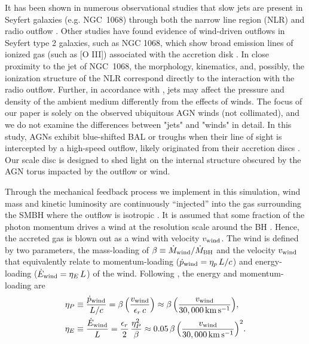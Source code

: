 \documentclass[fleqn,usenatbib]{mnras}
\begin{document}
It has been shown in numerous observational studies that slow jets are present in Seyfert galaxies (e.g. NGC~1068) through both the narrow line region (NLR) and radio outflow \citep[see][]{Axon1998, Roy2000, Gallimore1996a}. Other studies have found evidence of wind-driven outflows in Seyfert type 2 galaxies, such as NGC 1068, which show broad emission lines of ionized gas (such as [O III]) associated with the accretion disk \citep{Crenshaw2000}. In close proximity to the jet of NGC~1068, the morphology, kinematics, and, possibly, the ionization structure of the NLR correspond directly to the interaction with the radio outflow. Further, in accordance with \citet{Dugan2017}, jets may affect the pressure and density of the ambient medium differently from the effects of winds. 
The focus of our paper is solely on the observed ubiquitous AGN winds (not collimated), and we do not examine the differences between "jets" and "winds" in detail. 
In this study, AGNs exhibit blue-shifted BAL or troughs when their line of sight is intercepted by a high-speed outflow, likely originated from their accretion discs \citep[which is unresolved in the simulation; see][]{Hopkins2011}. Our scale disc is designed to shed light on the internal structure obscured by the AGN torus impacted by the outflow or wind.


Through the mechanical feedback process we implement in this simulation, wind mass and kinetic luminosity are continuously “injected” into the gas surrounding the SMBH where the outflow is isotropic \citep{Hopkins2016}.
It is assumed that some fraction of the photon momentum drives a wind at the resolution scale around the BH \citep{Murray1995}. Hence, the accreted gas is blown out as a wind with velocity $v_{\rm wind}$. The wind is defined by two parameters, the mass-loading of $\beta\equiv\dot{M}_{\rm wind}/\dot{M}_{\rm BH}$ and the velocity $v_{\rm wind}$ that equivalently relate to momentum-loading ($\dot{p}_{\rm wind}=\eta_{p}\,L/c$) and energy-loading ($\dot{E}_{\rm wind}=\eta_{E}\,L$) of the wind.
Following \cite{Hopkins2016}, the energy and momentum-loading are
\begin{align}\label{eq:momentum}
\eta_{P} &\equiv \frac{\dot{p}_{\rm wind}}{L/c} = \beta\,{\Bigl(}\frac{v_{\rm wind}}{\epsilon_{r}\,c}{\Bigr)}
\approx \beta\,{\Bigl(}\frac{v_{\rm wind}}{30,000\,{\rm km\,s^{-1}}}{\Bigr)}, \\ 
\eta_{E} &\equiv \frac{\dot{E}_{\rm wind}}{L} = \frac{\epsilon_{r}}{2}\,\frac{\eta_{P}^{2}}{\beta}
\approx0.05\,\beta\,{\Bigl(}\frac{v_{\rm wind}}{30,000\,{\rm km\,s^{-1}}}{\Bigr)}^{2}.
\end{align}
 
\end{document}
